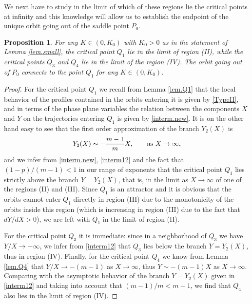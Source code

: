 \documentclass[a4paper,11pt]{article}
\newtheorem{proposition}[theorem]{Proposition}
\numberwithin{equation}{section}
\begin{document}
We next have to study in the limit of which of these regions lie the critical points at infinity and this knowledge will allow us to establish the endpoint of the unique orbit going out of the saddle point $P_0$.
\begin{proposition}\label{prop.small}
For any $K\in(0,K_0)$ with $K_0>0$ as in the statement of Lemma \ref{lem.small}, the critical point $Q_1$ lie in the limit of region (II), while the critical points $Q_3$ and $Q_4$ lie in the limit of the region (IV). The orbit going out of $P_0$ connects to the point $Q_1$ for any $K\in(0,K_0)$.
\end{proposition}
\begin{proof}
For the critical point $Q_1$ we recall from Lemma \ref{lem.Q1} that the local behavior of the profiles contained in the orbits entering it is given by \eqref{TypeII}, and in terms of the phase plane variables the relation between the components $X$ and $Y$ on the trajectories entering $Q_1$ is given by \eqref{interm.new}. It is on the other hand easy to see that the first order approximation of the branch $Y_2(X)$ is
\begin{equation}\label{interm12}
Y_2(X)\sim-\frac{m-1}{m}X, \qquad {\rm as} \ X\to\infty,
\end{equation}
and we infer from \eqref{interm.new}, \eqref{interm12} and the fact that $(1-p)/(m-1)<1$ in our range of exponents that the critical point $Q_1$ lies strictly above the branch $Y=Y_2(X)$, that is, in the limit as $X\to\infty$ of one of the regions (II) and (III). Since $Q_1$ is an attractor and it is obvious that the orbits cannot enter $Q_1$ directly in region (III) due to the monotonicity of the orbits inside this region (which is increasing in region (III) due to the fact that $dY/dX>0$), we are left with $Q_1$ in the limit of region (II).

For the critical point $Q_3$ it is immediate: since in a neighborhood of $Q_3$ we have $Y/X\to-\infty$, we infer from \eqref{interm12} that $Q_3$ lies below the branch $Y=Y_2(X)$, thus in region (IV). Finally, for the critical point $Q_4$ we know from Lemma \ref{lem.Q4} that $Y/X\to-(m-1)$ as $X\to\infty$, thus $Y\sim-(m-1)X$ as $X\to\infty$. Comparing with the asymptotic behavior of the branch $Y=Y_2(X)$ given in \eqref{interm12} and taking into account that $(m-1)/m<m-1$, we find that $Q_4$ also lies in the limit of region (IV).


\end{proof}
\end{document}
